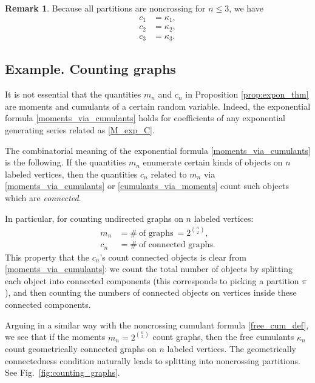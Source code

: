 \documentclass[letterpaper,11pt,oneside,reqno]{amsart}
\numberwithin{equation}{section}
\theoremstyle{definition}
\newtheorem{remark}[proposition]{Remark}
\begin{document}
\begin{remark}
	Because all partitions are noncrossing for $n\leq 3$, we have
	 \begin{align*}
	     c_1& =\kappa_1,\\
	     c_2& =\kappa_2,\\
	     c_3& =\kappa_3.
	 \end{align*}
\end{remark}


\subsection{Example. Counting graphs} %
\label{sub:example_counting_graphs}

It is not essential that the quantities $m_n$ and $c_n$ in Proposition \ref{prop:expon_thm}
are moments and cumulants of a certain random variable. 
Indeed, the exponential formula \eqref{moments_via_cumulants} holds
for coefficients of any exponential generating series related as 
\eqref{M_exp_C}.

The combinatorial meaning of the exponential formula \eqref{moments_via_cumulants}
is the following. If the quantities $m_n$ enumerate
certain kinds of objects on $n$ labeled vertices,
then the quantities $c_n$ related to $m_n$ via \eqref{moments_via_cumulants} 
or \eqref{cumulants_via_moments} count such objects which are \emph{connected}.

In particular, for counting undirected graphs on $n$ labeled vertices:
\begin{align*}
     m_n& =\# \ \text{of graphs}\ =2^{{n}\choose{2}},\\
     c_n& =\# \ \text{of connected graphs}.
\end{align*}
This property that the $c_n$'s count connected objects 
is clear from \eqref{moments_via_cumulants}: we count the total number
of objects by splitting each object into connected components
(this corresponds to picking a partition $\pi$),
and then counting the numbers of connected objects on vertices
inside these connected components.

Arguing in a similar way with the noncrossing cumulant formula \eqref{free_cum_def},
we see that if the moments $m_n=2^{\binom n2}$ count graphs, then the free cumulants
$\kappa_n$ count geometrically connected graphs on $n$ labeled vertices.
The geometrically connectedness condition naturally leads to splitting into noncrossing partitions.
See Fig.~\ref{fig:counting_graphs}.
\end{document}
